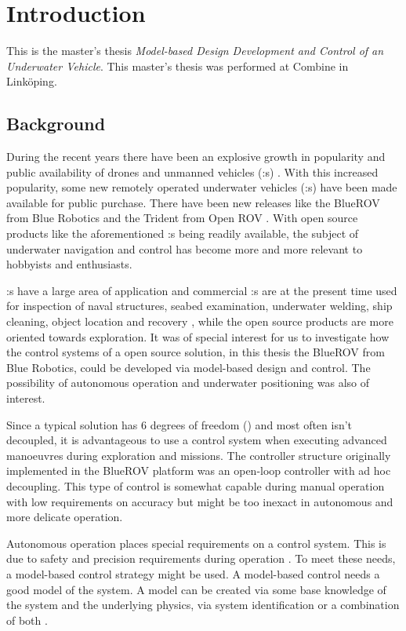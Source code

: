 \chapter{Introduction}\label{cha:intro}
This is the master's thesis \textit{Model-based Design Development and Control of an Underwater Vehicle}.
This master's thesis was performed at Combine in Linköping.

\section{Background}
During the recent years there have been an explosive growth in popularity and public availability of drones and unmanned vehicles (\abbrUV:s) \citep{popmechanics}. With this increased popularity, some new remotely operated underwater vehicles (\abbrROV:s) have been made available for public purchase. There have been new releases like the BlueROV from Blue Robotics \citep{bluerobotics} and the Trident from Open ROV \citep{openrov}. With open source products like the aforementioned \abbrROV:s being readily available, the subject of underwater navigation and control has become more and more relevant to hobbyists and enthusiasts.

\abbrROV:s have a large area of application and commercial \abbrROV:s are at the present time used for inspection of naval structures, seabed examination, underwater welding, ship cleaning, object location and recovery \citep{saab}, while the open source products are more oriented towards exploration. It was of special interest for us to investigate how the control systems of a open source \abbrROV solution, in this thesis the BlueROV from Blue Robotics, could be developed via model-based design and control. The possibility of autonomous operation and underwater positioning was also of interest.

Since a typical \abbrROV solution has 6 degrees of freedom (\abbrDOF) and most often isn't decoupled, it is advantageous to use a control system when executing advanced manoeuvres during exploration and missions. The controller structure originally implemented in the BlueROV platform was an open-loop controller with ad hoc decoupling. This type of control is somewhat capable during manual operation with low requirements on accuracy but might be too inexact in autonomous and more delicate operation. 

Autonomous operation places special requirements on a control system. This is due to safety and precision requirements during operation \citep[p.416-417]{safety}. To meet these needs, a model-based control strategy might be used. A model-based control needs a good model of the system. A model can be created via some base knowledge of the system and the underlying physics, via system identification or a combination of both \citet{modellbygge}. 

